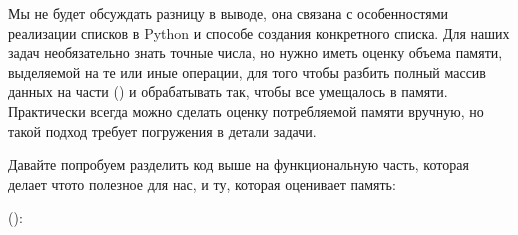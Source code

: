 \documentclass[letterpaper,10pt,russian]{sphinxmanual}
\begin{document}
\sphinxAtStartPar
Мы не будет обсуждать разницу в выводе, она связана с особенностями реализации списков в Python и способе создания конкретного списка. Для наших задач необязательно знать точные числа, но нужно иметь оценку объема памяти, выделяемой на те или иные операции, для того чтобы разбить полный массив данных на части () и обрабатывать так, чтобы все умещалось в памяти. Практически всегда можно сделать оценку потребляемой памяти вручную, но такой подход требует погружения в детали задачи.

\sphinxAtStartPar
Давайте попробуем разделить код выше на функциональную часть, которая делает что\sphinxhyphen{}то полезное для нас, и ту, которая оценивает память:

\sphinxAtStartPar
():

\begin{sphinxVerbatim}[commandchars=\\\{\}]
 
 

 
      \PYG{p}{[}    \PYG{p}{]}    
     
    
  
      
      
      
    \PYG{p}{[}\PYG{p}{]}\PYG{p}{[}\PYG{p}{]}
      
    
   
     
\end{sphinxVerbatim}
\end{document}
